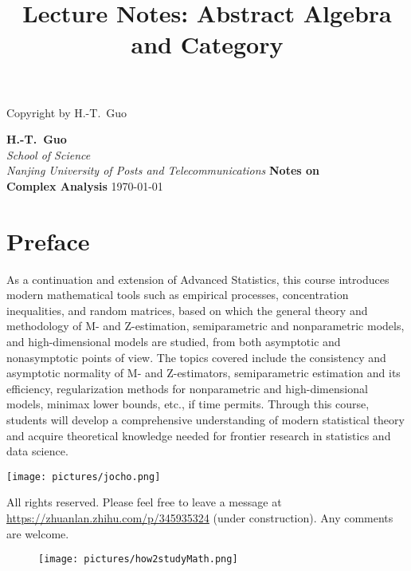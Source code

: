 \documentclass[12pt, a3paper, openany]{book}
\title{Lecture Notes: Abstract Algebra and Category}
\begin{document}
\begin{titlepage}
  \null\hfill Copyright  by H.-T.~Guo
  \vspace{2.5cm}
\begin{flushright}
\vfill
\large{\bf H.-T.~Guo}\\
\large{\textit{School of Science\\
Nanjing University of Posts and Telecommunications}}
\vfill
\Huge{\bf \textbf{Notes on}}\\
\Huge{\bf Complex Analysis}
\vfill
\vfill
\vfill
\vfill
{\Large \today}\\ 
 
  
\end{flushright}
\end{titlepage}

\chapter*{Preface}
As a continuation and extension of Advanced Statistics, this course introduces modern mathematical tools such as empirical processes, concentration inequalities, and random matrices, based on which the general theory and methodology of M- and Z-estimation, semiparametric and nonparametric models, and high-dimensional models are studied, from both asymptotic and nonasymptotic points of view. The topics covered include the consistency and asymptotic normality of M- and Z-estimators, semiparametric estimation and its efficiency, regularization methods for nonparametric and high-dimensional models, minimax lower bounds, etc., if time permits. Through this course, students will develop a comprehensive understanding of modern statistical theory and acquire theoretical knowledge needed for frontier research in statistics and data science.

\vspace{2ex}
\begin{center}
	\texttt{[image: pictures/jocho.png]}
\end{center}
\vspace{2.5ex}
All rights reserved.
Please feel free to leave a message at \url{https://zhuanlan.zhihu.com/p/345935324} {\color{lightgray} (under construction)}. Any comments are welcome. {\Large \PeaceDove}
\begin{figure}[!b]
	\centering
	\texttt{[image: pictures/how2studyMath.png]}
	\vspace{11ex}
\end{figure}
\clearpage
\end{document}
